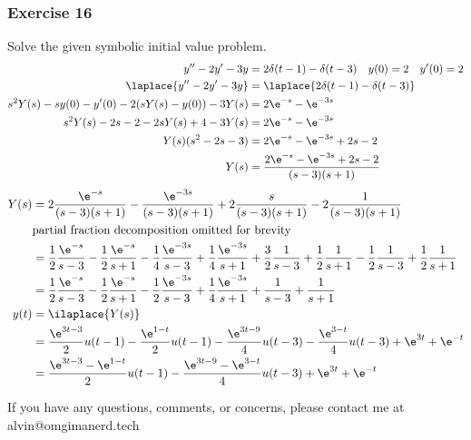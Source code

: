 \documentclass{math}
\begin{document}
\subsubsection*{Exercise 16}
Solve the given symbolic initial value problem.
\begin{align*}
  y''-2y'-3y &= 2\delta(t-1)-\delta(t-3) \quad y(0) = 2 \quad y'(0) = 2 \\
  \laplace{y''-2y'-3y} &= \laplace{2\delta(t-1)-\delta(t-3)} \\
  s^2Y(s)-sy(0)-y'(0)-2(sY(s)-y(0))-3Y(s) &= 2\e^{-s}-\e^{-3s} \\
  s^2Y(s)-2s-2-2sY(s)+4-3Y(s) &= 2\e^{-s}-\e^{-3s} \\
  Y(s)(s^2-2s-3) &= 2\e^{-s}-\e^{-3s}+2s-2 \\
  Y(s) &= \frac{2\e^{-s}-\e^{-3s}+2s-2}{(s-3)(s+1)}
\end{align*}
\begin{align*}
  Y(s) &= 2\frac{\e^{-s}}{(s-3)(s+1)}-
    \frac{\e^{-3s}}{(s-3)(s+1)}+
    2\frac{s}{(s-3)(s+1)}-
    2\frac{1}{(s-3)(s+1)} \\
  & \text{partial fraction decomposition omitted for brevity} \\
  &= \frac{1}{2}\frac{\e^{-s}}{s-3}-\frac{1}{2}\frac{\e^{-s}}{s+1}-
    \frac{1}{4}\frac{\e^{-3s}}{s-3}+\frac{1}{4}\frac{\e^{-3s}}{s+1}+
    \frac{3}{2}\frac{1}{s-3}+\frac{1}{2}\frac{1}{s+1}-
    \frac{1}{2}\frac{1}{s-3}+\frac{1}{2}\frac{1}{s+1} \\
  &= \frac{1}{2}\frac{\e^{-s}}{s-3}-\frac{1}{2}\frac{\e^{-s}}{s+1}-
    \frac{1}{2}\frac{\e^{-3s}}{s-3}+\frac{1}{4}\frac{\e^{-3s}}{s+1}+
    \frac{1}{s-3}+\frac{1}{s+1} \\
  y(t) &= \ilaplace{Y(s)} \\
  &= \frac{\e^{3t-3}}{2}u(t-1)-\frac{\e^{1-t}}{2}u(t-1)-
    \frac{\e^{3t-9}}{4}u(t-3)-\frac{\e^{3-t}}{4}u(t-3)+
    \e^{3t}+\e^{-t} \\
  &= \frac{\e^{3t-3}-\e^{1-t}}{2}u(t-1)-\frac{\e^{3t-9}-\e^{3-t}}{4}u(t-3)+
    \e^{3t}+\e^{-t}
\end{align*}

\begin{center}
  If you have any questions, comments, or concerns, please contact me at
  alvin@omgimanerd.tech
\end{center}
\end{document}
